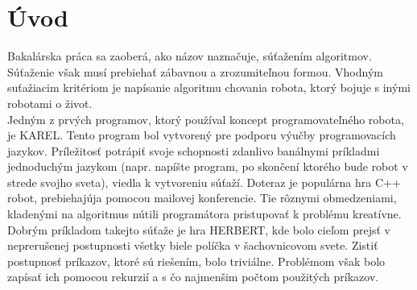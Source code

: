 \chapter{Úvod}
Bakalárska práca sa zaoberá, ako názov naznačuje, súťažením algoritmov. Súťaženie však musí prebiehať zábavnou a zrozumiteľnou formou.
Vhodným suťažiacim kritériom je napísanie algoritmu chovania robota, ktorý  bojuje s inými robotami o život. \\ %
\indent Jedným z prvých programov, ktorý používal koncept programovateľného robota, je KAREL\cite{Karel}. Tento program bol vytvorený pre podporu výučby programovacích jazykov. Príležitosť potrápiť svoje schopnosti zdanlivo banálnymi príkladmi jednoduchým jazykom (napr. napíšte program, po skončení ktorého bude robot v strede svojho sveta), viedla k vytvoreniu súťaží. Doteraz je populárna hra C++ robot\cite{crobots}, prebiehajúja pomocou mailovej konferencie. Tie rôznymi obmedzeniami, kladenými na algoritmus nútili programátora pristupovať k problému kreatívne.\\
\indent Dobrým príkladom takejto súťaže je hra HERBERT\cite{herbert}, kde bolo cieľom prejsť v neprerušenej postupnosti všetky biele políčka v šachovnicovom svete. Zistiť postupnosť príkazov, ktoré sú riešením, bolo triviálne. Problémom však bolo zapísať ich pomocou rekurzií a s čo najmenšim počtom použitých príkazov.
